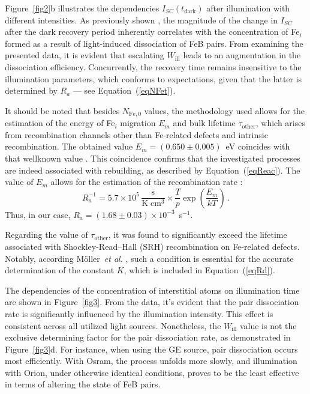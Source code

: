 \documentclass{WileyMSP-template}
\begin{document}
Figure~\ref{fig2}b illustrates the dependencies $I_{SC}(t_\mathrm{dark})$ after illumination with different intensities.
As previously shown \cite{Olikh2021JAP}, the magnitude of the change in $I_{SC}$ after the dark recovery period
inherently correlates with the concentration of Fe$_i$ formed as a result of light-induced dissociation of FeB pairs.
From examining the presented data, it is evident that escalating $W_\mathrm{ill}$ leads to an augmentation in the dissociation efficiency.
Concurrently, the recovery time remains insensitive to the illumination parameters, which conforms to expectations,
given that the latter is determined by $R_a$ --- see Equation~(\ref{eqNFet}).

It should be noted that besides $N_\mathrm{Fe,0}$ values,
the methodology used allows for the estimation of the energy of Fe$_i$ migration $E_m$
and bulk lifetime $\tau_\mathrm{other}$, which arises from recombination channels other than Fe-related defects and intrinsic recombination.
The obtained value $E_m=(0.650\pm0.005)$~eV coincides with that wellknown value \cite{FeBKin2019,FeBAssSST2011,FeBkinAPL2008}.
This coincidence confirms that the investigated processes are indeed associated with rebuilding,
as described by Equation~(\ref{eqReac}).
The value of $E_m$ allows for the estimation of the recombination rate \cite{FeBAssJAP2014,FeBKin2019,FeBAssSST2011}:
\begin{equation}
\label{eqTass}
R_a^{-1}=5.7\times10^5\,\frac{\mathrm{s}}{\mathrm{K}\;\mathrm{cm}^3}\times\frac{T}{p}\exp\left(\frac{E_m}{kT}\right)\,.
\end{equation}
Thus, in our case, $R_a=(1.68\pm0.03)\times10^{-3}$~s$^{-1}$.

Regarding the value of $\tau_\mathrm{other}$, it was found to significantly exceed the
lifetime associated with Shockley-Read–Hall (SRH) recombination on Fe-related defects.
Notably, according M\"{o}ller~\emph{et al.} \cite{FeBAssJAP2014},
such a condition is essential for the accurate determination of the constant $K$, which is included in Equation~(\ref{eqRd}).


The dependencies of the concentration of interstitial atoms on illumination time are shown in Figure~\ref{fig3}.
From the data, it's evident that the pair dissociation rate is significantly influenced by the illumination intensity.
This effect is consistent across all utilized light sources.
Nonetheless, the $W_\mathrm{ill}$ value is not the exclusive determining factor for the pair dissociation rate,
as demonstrated in Figure~\ref{fig3}d.
For instance, when using the GE source, pair dissociation occurs most efficiently.
With Osram, the process unfolds more slowly,
and illumination with Orion, under otherwise identical conditions, proves to be the least effective in terms of altering the state of FeB pairs.
\end{document}
